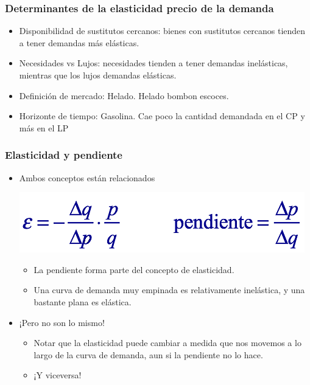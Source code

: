 \documentclass{beamer}
\begin{document}
\begin{frame}
\frametitle{Determinantes de la elasticidad precio de la demanda}
\begin{itemize}
    \item Disponibilidad de sustitutos cercanos: bienes con sustitutos cercanos tienden a tener demandas más elásticas.\vspace{4mm}
 \item Necesidades vs Lujos: necesidades tienden a tener demandas inelásticas, mientras que los lujos demandas elásticas.\vspace{4mm}
\item Definición de mercado: Helado. Helado bombon escoces.\vspace{4mm}
\item Horizonte de tiempo: Gasolina. Cae poco la cantidad demandada en el CP y más en el LP
    \end{itemize}
\end{frame}

\begin{frame}
\frametitle{Elasticidad y pendiente}
\begin{itemize}
    \item Ambos conceptos están relacionados
    \begin{center}
    \includegraphics[scale=0.5]{Slides Principios de Economia/Figures/Tema_06.44_elasticidadpendiente.png}
    \end{center}
        \begin{itemize}
        \item La pendiente forma parte del concepto de elasticidad.\vspace{2mm}
        \item Una curva de demanda muy empinada es relativamente inelástica, y una bastante plana es elástica.\vspace{4mm}
        \end{itemize}
    \item ¡Pero no son lo mismo!\vspace{2mm}
        \begin{itemize}
            \item Notar que la elasticidad puede cambiar a medida que nos movemos a lo largo de la curva de demanda, aun si la pendiente no lo hace.\vspace{2mm}
            \item ¡Y viceversa!
        \end{itemize}
    \end{itemize}
\end{frame}
\end{document}
